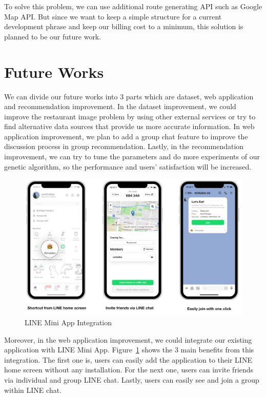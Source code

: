 \documentclass[12pt,oneside,openright,a4paper]{cpe-english-project}
\begin{document}
To solve this problem, we can use additional route generating API such as Google Map API. But since we want to keep a simple structure for a current development phrase and keep our billing cost to a minimum, this solution is planned to be our future work.

\section{Future Works}

We can divide our future works into 3 parts which are dataset, web application and recommendation improvement. In the dataset improvement, we could improve the restaurant image problem by using other external services or try to find alternative data sources that provide us more accurate information. In web application improvement, we plan to add a group chat feature to improve the discussion process in group recommendation. Lastly, in the recommendation improvement, we can try to tune the parameters and do more experiments of our genetic algorithm, so the performance and users’ satisfaction will be increased.

\begin{figure}[H]\centering
\includegraphics[width=400pt]{./images/5LINEMiniAppIntegration.png}
\caption{LINE Mini App Integration}\label{fig:5LINEMiniAppIntegration}
\end{figure}

Moreover, in the web application improvement, we could integrate our existing application with LINE Mini App. Figure~\ref{fig:5LINEMiniAppIntegration} shows the 3 main benefits from this integration. The first one is, users can easily add the application to their LINE home screen without any installation. For the next one, users can invite friends via individual and group LINE chat. Lastly, users can easily see and join a group within LINE chat.
\end{document}
